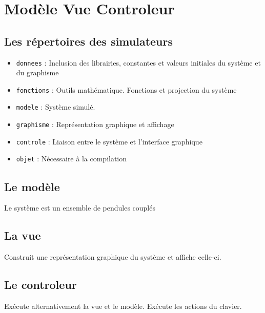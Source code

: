 %
\section{Modèle Vue Controleur}
%
%
\subsection{Les répertoires des simulateurs}
\begin{itemize}[leftmargin=2cm]
\item \texttt{donnees} : Inclusion des librairies, constantes et valeurs initiales du système et du graphisme
\item \texttt{fonctions} : Outils mathématique. Fonctions et projection du système
\item \texttt{modele} : Système simulé. 
\item \texttt{graphisme} : Représentation graphique et affichage
\item \texttt{controle} : Liaison entre le système et l'interface graphique 
\item \texttt{objet} : Nécessaire à la compilation
\end{itemize}
%
\subsection{Le modèle}
Le système est un ensemble de pendules couplés
%
\subsection{La vue}
Construit une représentation graphique du système et affiche celle-ci.
%
\subsection{Le controleur}
Exécute alternativement la vue et le modèle. Exécute les actions du clavier.
%
